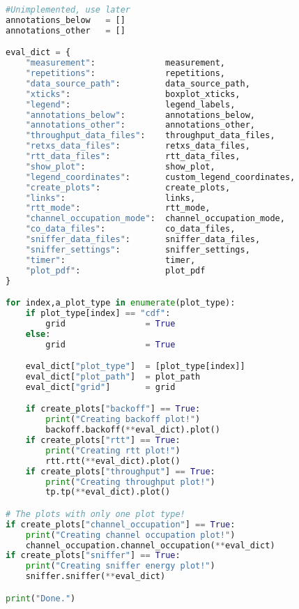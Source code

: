 \begin{lstlisting}[language=Python,caption=evaluation.py]
#Unimplemented, use later
annotations_below   = []
annotations_other   = []

eval_dict = {
    "measurement":              measurement,
    "repetitions":              repetitions,
    "data_source_path":         data_source_path,
    "xticks":                   boxplot_xticks,
    "legend":                   legend_labels,
    "annotations_below":        annotations_below,
    "annotations_other":        annotations_other,
    "throughput_data_files":    throughput_data_files,
    "retxs_data_files":         retxs_data_files,
    "rtt_data_files":           rtt_data_files,
    "show_plot":                show_plot,
    "legend_coordinates":       custom_legend_coordinates,
    "create_plots":             create_plots,
    "links":                    links,
    "rtt_mode":                 rtt_mode,
    "channel_occupation_mode":  channel_occupation_mode,
    "co_data_files":            co_data_files,
    "sniffer_data_files":       sniffer_data_files,
    "sniffer_settings":         sniffer_settings,
    "timer":                    timer,
    "plot_pdf":                 plot_pdf
}

for index,a_plot_type in enumerate(plot_type):
    if plot_type[index] == "cdf":
        grid                = True
    else:
        grid                = True

    eval_dict["plot_type"]  = [plot_type[index]]
    eval_dict["plot_path"]  = plot_path
    eval_dict["grid"]       = grid

    if create_plots["backoff"] == True:
        print("Creating backoff plot!")
        backoff.backoff(**eval_dict).plot()
    if create_plots["rtt"] == True:
        print("Creating rtt plot!")
        rtt.rtt(**eval_dict).plot()
    if create_plots["throughput"] == True:
        print("Creating throughput plot!")
        tp.tp(**eval_dict).plot()

# The plots with only one plot type!
if create_plots["channel_occupation"] == True:
    print("Creating channel occupation plot!")
    channel_occupation.channel_occupation(**eval_dict)
if create_plots["sniffer"] == True:
    print("Creating sniffer energy plot!")
    sniffer.sniffer(**eval_dict)

print("Done.")
\end{lstlisting}